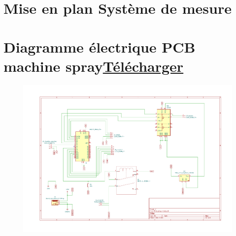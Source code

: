 \section[Mise en plan Système de mesure]{Mise en plan Système de mesure}\label{mise_en_plan_systeme_mesure}

\begin{figure}[H]
    \centering
    
\end{figure}


\section[Diagramme électrique PCB machine spray]{Diagramme électrique PCB machine spray\href{https://1drv.ms/b/s!Altwa7Vt0GlIj55oN6zv-TJly9lecA?e=SIccNb}{Télécharger}}\label{PCB:spray}
\begin{figure}[H]
    \centering
    \includegraphics[angle = 90,height = 0.8\paperheight]{assets/Annexes/Diagramme_PCB_spray.pdf}
\end{figure}